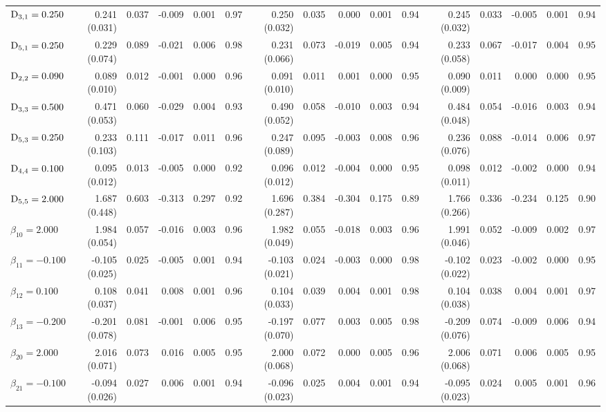 \begin{landscape}
\begin{table}[ht]
\begin{tabular}{l|rrrrr:rrrrr:rrrrr}
  $\mathrm{D}_{3,1}= 0.250$ &  0.241 (0.031) & 0.037 & -0.009 & 0.001 & 0.97 &  0.250 (0.032) & 0.035 &  0.000 & 0.001 & 0.94 &  0.245 (0.032) & 0.033 & -0.005 & 0.001 & 0.94 \\ 
  $\mathrm{D}_{5,1}= 0.250$ &  0.229 (0.074) & 0.089 & -0.021 & 0.006 & 0.98 &  0.231 (0.066) & 0.073 & -0.019 & 0.005 & 0.94 &  0.233 (0.058) & 0.067 & -0.017 & 0.004 & 0.95 \\ 
  $\mathrm{D}_{2,2}= 0.090$ &  0.089 (0.010) & 0.012 & -0.001 & 0.000 & 0.96 &  0.091 (0.010) & 0.011 &  0.001 & 0.000 & 0.95 &  0.090 (0.009) & 0.011 &  0.000 & 0.000 & 0.95 \\ 
  $\mathrm{D}_{3,3}= 0.500$ &  0.471 (0.053) & 0.060 & -0.029 & 0.004 & 0.93 &  0.490 (0.052) & 0.058 & -0.010 & 0.003 & 0.94 &  0.484 (0.048) & 0.054 & -0.016 & 0.003 & 0.94 \\ 
  $\mathrm{D}_{5,3}= 0.250$ &  0.233 (0.103) & 0.111 & -0.017 & 0.011 & 0.96 &  0.247 (0.089) & 0.095 & -0.003 & 0.008 & 0.96 &  0.236 (0.076) & 0.088 & -0.014 & 0.006 & 0.97 \\ 
  $\mathrm{D}_{4,4}= 0.100$ &  0.095 (0.012) & 0.013 & -0.005 & 0.000 & 0.92 &  0.096 (0.012) & 0.012 & -0.004 & 0.000 & 0.95 &  0.098 (0.011) & 0.012 & -0.002 & 0.000 & 0.94 \\ 
  $\mathrm{D}_{5,5}= 2.000$ &  1.687 (0.448) & 0.603 & -0.313 & 0.297 & 0.92 &  1.696 (0.287) & 0.384 & -0.304 & 0.175 & 0.89 &  1.766 (0.266) & 0.336 & -0.234 & 0.125 & 0.90 \\ 
  $\beta_{10}= 2.000$ &  1.984 (0.054) & 0.057 & -0.016 & 0.003 & 0.96 &  1.982 (0.049) & 0.055 & -0.018 & 0.003 & 0.96 &  1.991 (0.046) & 0.052 & -0.009 & 0.002 & 0.97 \\ 
  $\beta_{11}=-0.100$ & -0.105 (0.025) & 0.025 & -0.005 & 0.001 & 0.94 & -0.103 (0.021) & 0.024 & -0.003 & 0.000 & 0.98 & -0.102 (0.022) & 0.023 & -0.002 & 0.000 & 0.95 \\ 
  $\beta_{12}= 0.100$ &  0.108 (0.037) & 0.041 &  0.008 & 0.001 & 0.96 &  0.104 (0.033) & 0.039 &  0.004 & 0.001 & 0.98 &  0.104 (0.038) & 0.038 &  0.004 & 0.001 & 0.97 \\ 
  $\beta_{13}=-0.200$ & -0.201 (0.078) & 0.081 & -0.001 & 0.006 & 0.95 & -0.197 (0.070) & 0.077 &  0.003 & 0.005 & 0.98 & -0.209 (0.076) & 0.074 & -0.009 & 0.006 & 0.94 \\ 
  $\beta_{20}= 2.000$ &  2.016 (0.071) & 0.073 &  0.016 & 0.005 & 0.95 &  2.000 (0.068) & 0.072 &  0.000 & 0.005 & 0.96 &  2.006 (0.068) & 0.071 &  0.006 & 0.005 & 0.95 \\ 
  $\beta_{21}=-0.100$ & -0.094 (0.026) & 0.027 &  0.006 & 0.001 & 0.94 & -0.096 (0.023) & 0.025 &  0.004 & 0.001 & 0.94 & -0.095 (0.023) & 0.024 &  0.005 & 0.001 & 0.96 \\ 

\end{tabular}
\end{table}
\end{landscape}
